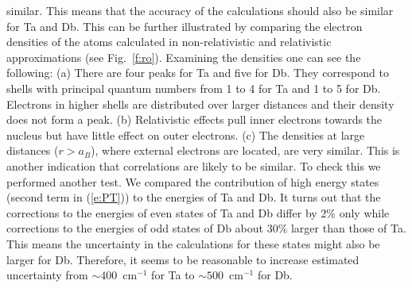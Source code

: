 \documentclass[8pt,a4paper, twoside]{report}
\begin{document}
similar. This means that the accuracy of the calculations should also be similar for Ta and Db.
This can be further illustrated by comparing the electron densities of the atoms calculated in non-relativistic and relativistic
approximations (see Fig.~\ref{f:ro}). Examining the densities one can see the following:
(a) There are four peaks for Ta and five for Db. They correspond to shells with principal quantum numbers from 1 to 4 for
Ta and 1 to 5 for Db. Electrons in higher shells are distributed over larger distances and their density does not form a peak.
(b)  Relativistic effects pull inner electrons towards the nucleus but have little effect on outer electrons.
(c) The densities at large distances ($r>a_B$), where external electrons are located, are very similar.
This is another indication that correlations are likely to be similar.  To check this we performed another test. We
compared the contribution of high energy states (second term in (\ref{e:PT})) to the energies of Ta and Db.
It turns out that the corrections to the energies of even states of Ta and Db differ by 2\% only while corrections to 
the energies of odd states of Db about 30\% larger than those of Ta. This means the uncertainty in the calculations for these
states might also be larger for Db. Therefore, it seems to be reasonable to increase estimated uncertainty from 
$ \sim 400$~cm$^{-1}$ for Ta to $ \sim 500$~cm$^{-1}$ for Db.
\end{document}
